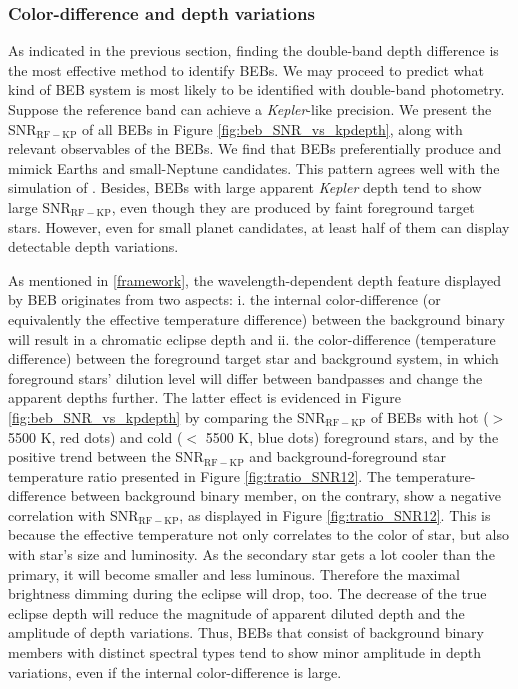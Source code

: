 \documentclass{aastex63}
\begin{document}
	\subsubsection{Color-difference and depth variations}
        
    As indicated in the previous section, finding the double-band depth difference is the most effective method to identify BEBs. We may proceed to predict what kind of BEB system is most likely to be identified with double-band photometry. Suppose the reference band can achieve a \emph{Kepler}-like precision. We present the SNR$_\mathrm{RF-KP}$ of all BEBs in Figure \ref{fig:beb_SNR_vs_kpdepth}, along with relevant observables of the BEBs. We find that BEBs preferentially produce and mimick Earths and small-Neptune candidates. This pattern agrees well with the simulation of \cite{Fressin2013}. Besides, BEBs with large apparent \emph{Kepler} depth tend to show large SNR$_\mathrm{RF-KP}$, even though they are produced by faint foreground target stars. However, even for small planet candidates, at least half of them can display detectable depth variations.
    
    As mentioned in \ref{framework}, the wavelength-dependent depth feature displayed by BEB originates from two aspects: i. the internal color-difference (or equivalently the effective temperature difference) between the background binary will result in a chromatic eclipse depth and ii. the color-difference (temperature difference) between the foreground target star and background system, in which foreground stars' dilution level will differ between bandpasses and change the apparent depths further. The latter effect is evidenced in Figure \ref{fig:beb_SNR_vs_kpdepth} by comparing the SNR$_\mathrm{RF-KP}$ of BEBs with hot ($>$ 5500 K, red dots) and cold ($<$ 5500 K, blue dots) foreground stars, and by the positive trend between the SNR$_\mathrm{RF-KP}$ and background-foreground star temperature ratio presented in Figure \ref{fig:tratio_SNR12}. The temperature-difference between background binary member, on the contrary, show a negative correlation with SNR$_\mathrm{RF-KP}$, as displayed in Figure \ref{fig:tratio_SNR12}. This is because the effective temperature not only correlates to the color of star, but also with star's size and luminosity. As the secondary star gets a lot cooler than the primary, it will  become smaller and less luminous. Therefore the maximal brightness dimming during the eclipse will drop, too. The decrease of the true eclipse depth will reduce the magnitude of apparent diluted depth and the amplitude of depth variations. Thus, BEBs that consist of background binary members with distinct spectral types tend to show minor amplitude in depth variations, even if the internal color-difference is large.
    
\end{document}
